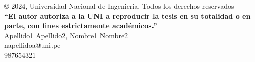 \begin{permisos}

    \onehalfspacing  %

    © 2024, Universidad Nacional de Ingeniería. Todos los derechos reservados \\
    \textbf{``El autor autoriza a la UNI a reproducir la tesis en su totalidad o en parte, con fines estrictamente académicos.''} \\
    Apellido1 Apellido2, Nombre1 Nombre2 \\
    napellidoa@uni.pe \\
    987654321

    \singlespacing  %

\end{permisos}
